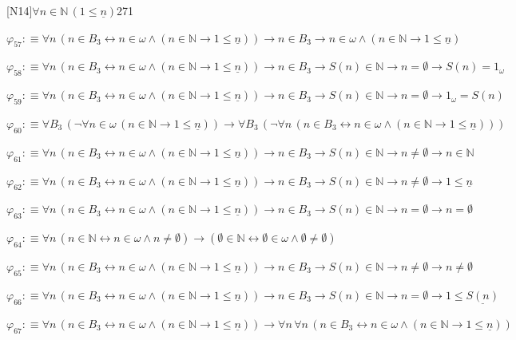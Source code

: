 \begin{fullproof}{[N14]}{$\forall n \in \mathbb{N}\,(1 \leq \underline{n})$}{271}
\begin{abbrevlist}
\item $\varphi_{57} :\equiv \forall n\,(n \in B_{3} \leftrightarrow n \in \omega \land (n \in \mathbb{N} \to 1 \leq \underline{n})) \to n \in B_{3} \to n \in \omega \land (n \in \mathbb{N} \to 1 \leq \underline{n})$
\item $\varphi_{58} :\equiv \forall n\,(n \in B_{3} \leftrightarrow n \in \omega \land (n \in \mathbb{N} \to 1 \leq \underline{n})) \to n \in B_{3} \to S(n) \in \mathbb{N} \to n = \emptyset \to S(n) = 1_{\omega}$
\item $\varphi_{59} :\equiv \forall n\,(n \in B_{3} \leftrightarrow n \in \omega \land (n \in \mathbb{N} \to 1 \leq \underline{n})) \to n \in B_{3} \to S(n) \in \mathbb{N} \to n = \emptyset \to 1_{\omega} = S(n)$
\item $\varphi_{60} :\equiv \forall B_{3}\,(\neg \forall n \in \omega\,(n \in \mathbb{N} \to 1 \leq \underline{n})) \to \forall B_{3}\,(\neg \forall n\,(n \in B_{3} \leftrightarrow n \in \omega \land (n \in \mathbb{N} \to 1 \leq \underline{n})))$
\item $\varphi_{61} :\equiv \forall n\,(n \in B_{3} \leftrightarrow n \in \omega \land (n \in \mathbb{N} \to 1 \leq \underline{n})) \to n \in B_{3} \to S(n) \in \mathbb{N} \to n \neq \emptyset \to n \in \mathbb{N}$
\item $\varphi_{62} :\equiv \forall n\,(n \in B_{3} \leftrightarrow n \in \omega \land (n \in \mathbb{N} \to 1 \leq \underline{n})) \to n \in B_{3} \to S(n) \in \mathbb{N} \to n \neq \emptyset \to 1 \leq \underline{n}$
\item $\varphi_{63} :\equiv \forall n\,(n \in B_{3} \leftrightarrow n \in \omega \land (n \in \mathbb{N} \to 1 \leq \underline{n})) \to n \in B_{3} \to S(n) \in \mathbb{N} \to n = \emptyset \to n = \emptyset$
\item $\varphi_{64} :\equiv \forall n\,(n \in \mathbb{N} \leftrightarrow n \in \omega \land n \neq \emptyset) \to (\emptyset \in \mathbb{N} \leftrightarrow \emptyset \in \omega \land \emptyset \neq \emptyset)$
\item $\varphi_{65} :\equiv \forall n\,(n \in B_{3} \leftrightarrow n \in \omega \land (n \in \mathbb{N} \to 1 \leq \underline{n})) \to n \in B_{3} \to S(n) \in \mathbb{N} \to n \neq \emptyset \to n \neq \emptyset$
\item $\varphi_{66} :\equiv \forall n\,(n \in B_{3} \leftrightarrow n \in \omega \land (n \in \mathbb{N} \to 1 \leq \underline{n})) \to n \in B_{3} \to S(n) \in \mathbb{N} \to n = \emptyset \to 1 \leq \underline{S(n)}$
\item $\varphi_{67} :\equiv \forall n\,(n \in B_{3} \leftrightarrow n \in \omega \land (n \in \mathbb{N} \to 1 \leq \underline{n})) \to \forall n\,\forall n\,(n \in B_{3} \leftrightarrow n \in \omega \land (n \in \mathbb{N} \to 1 \leq \underline{n}))$

\end{abbrevlist}
\end{fullproof}
